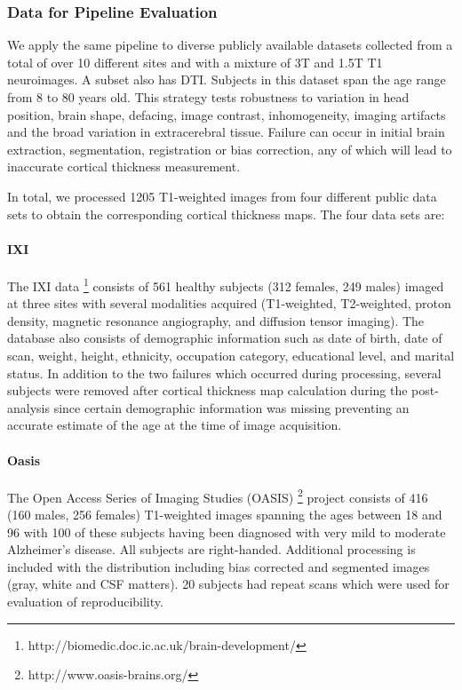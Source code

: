 \subsubsection{Data for Pipeline Evaluation}
We apply the same pipeline to diverse publicly available datasets collected
from a total of over 10 different sites and with a mixture of 3T and
1.5T T1 neuroimages.  A subset also has DTI.  Subjects in this dataset
span the age range from 8 to 80 years old.  This strategy tests robustness to
variation in head position, brain shape, defacing, image contrast, inhomogeneity, imaging
artifacts and the broad variation in extracerebral tissue.  Failure
can occur in initial brain extraction, segmentation, registration or
bias correction, any of which will lead to inaccurate cortical
thickness measurement.                           

In total, we processed 1205 T1-weighted images from four different
public data sets to obtain the corresponding cortical thickness maps.                           
The four data sets are: 
                                          
\paragraph{IXI}
The IXI data%
\footnote{
http://biomedic.doc.ic.ac.uk/brain-development/
}
consists of 561 healthy subjects (312 females, 249 males) imaged at three sites 
with several modalities acquired (T1-weighted, T2-weighted, proton density, magnetic 
resonance angiography, and diffusion tensor imaging).  The 
database also consists of  demographic information such as date of birth, date
of scan, weight,
height, ethnicity, occupation category, educational level, and marital status.
In addition to the two failures which occurred during processing, several subjects 
were removed after cortical thickness map calculation during the post-analysis 
since certain demographic information was missing preventing an accurate estimate of 
the age at the time of image acquisition.

\paragraph{Oasis}
The Open Access Series of Imaging Studies (OASIS)%
\footnote{
http://www.oasis-brains.org/
}
 project consists of 416
(160 males, 256 females) T1-weighted images spanning 
the ages between 18 and 96 with 100 of these subjects having been 
diagnosed with very mild to moderate Alzheimer's disease.  
All subjects are right-handed.  Additional processing is included
with the distribution including bias corrected and segmented images
(gray, white and CSF matters).  20 subjects had repeat scans which
were used for evaluation of reproducibility.

